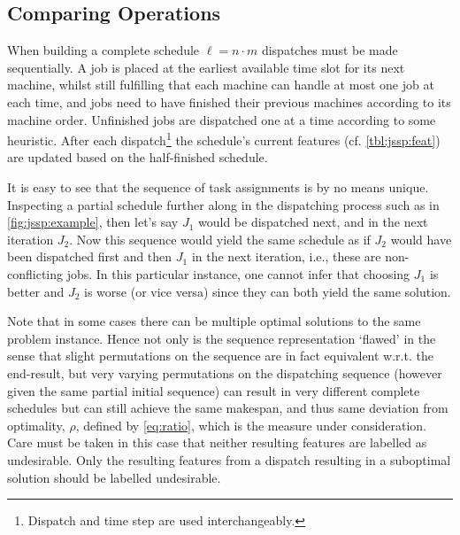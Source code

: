 \documentclass[smallextended]{svjour3}
\begin{document}
\subsection{Comparing Operations}\label{sec:compare}
When building a complete schedule $\ell=n\cdot m$ dispatches must be made 
sequentially.  A job is placed at the earliest available time slot for its next 
machine, whilst still fulfilling that each machine can handle at most one job 
at each time, and jobs need to have finished their previous machines according 
to its machine order. Unfinished jobs are dispatched one at a time according to 
some heuristic. After each dispatch\footnote{Dispatch and time step are used 
	interchangeably.} the schedule's current features (cf. \cref{tbl:jssp:feat}) 
are updated based on the half-finished schedule.

It is easy to see that the sequence of task assignments is by no means unique. 
Inspecting a partial schedule further along in the dispatching process such as 
in \cref{fig:jssp:example}, then let's say $J_1$ would be dispatched next, and 
in the next iteration $J_2$. Now this sequence would yield the same schedule as 
if $J_2$ would have been dispatched first and then $J_1$ in the next iteration, 
i.e., these are non-conflicting jobs.  In this particular instance, one cannot 
infer that choosing $J_1$ is better and $J_2$ is worse (or vice versa) since
they can both yield the same solution. 

Note that in some cases there can be multiple optimal solutions to the same 
problem instance. Hence not only is the sequence representation `flawed' in the 
sense that slight permutations on the sequence are in fact equivalent w.r.t. 
the end-result, but very varying permutations on the dispatching sequence 
(however given the same partial initial sequence) can result in very different 
complete schedules but can still achieve the same makespan, and thus same 
deviation from optimality, $\rho$, defined by \eqref{eq:ratio}, which is the 
measure under consideration. Care must be taken in this case that neither 
resulting features are labelled as undesirable. Only the resulting features 
from a dispatch resulting in a suboptimal solution should be labelled 
undesirable.
\end{document}
